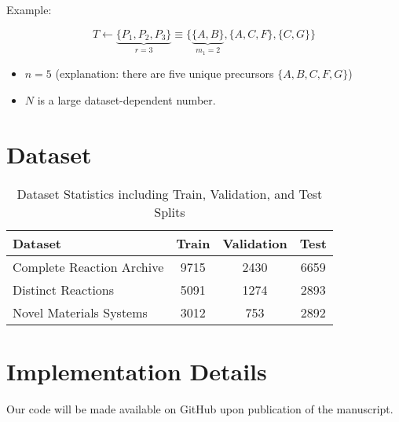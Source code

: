 
Example: 

\begin{equation}
    T \leftarrow \underbrace{\{P_1, P_2, P_3 \}}_{r=3} \equiv \{ \underbrace{\{A,B\}}_{m_1=2}, \{A,C,F\}, \{C,G\} \}
\end{equation}

\begin{itemize}
    \item $n=5$ (explanation: there are five unique precursors $\{A,B,C,F,G\}$)
    \item $N$ is a large dataset-dependent number.
\end{itemize}





\section{Dataset}

\begin{table}[h]
    \centering
    \caption{Dataset Statistics including Train, Validation, and Test Splits}
    \label{tab:dataset_stats}
    \begin{tabular}{lccc}
        \toprule
        Dataset & Train & Validation & Test \\
        \midrule
        Complete Reaction Archive    & 9715  & 2430       & 6659 \\
        Distinct Reactions  & 5091  & 1274       & 2893 \\
        Novel Materials Systems    & 3012  & 753        & 2892 \\
        \bottomrule
    \end{tabular}
\end{table}

\label{Appendix:Dataset}

\section{Implementation Details}
Our code will be made available on GitHub upon publication of the manuscript.



